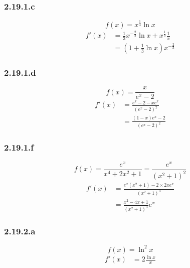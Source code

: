 \documentclass[a4paper,10pt]{report}
\begin{document}
\subsubsection*{2.19.1.c}
\begin{displaymath}
	f(x) = x^{\frac{1}{3}} \ln x
\end{displaymath}
\begin{equation*}
	\begin{split}
		f'(x) &= \frac{1}{3} x^{-\frac{2}{3}} \ln x + x^{\frac{1}{3}} \frac{1}{x} \\
		      &=\left(1 + \frac{1}{3}\ln x \right) x^{-\frac{2}{3}}
	\end{split}	
\end{equation*}

\subsubsection*{2.19.1.d}
\begin{displaymath}
	f(x) = \frac{x}{e^x-2}
\end{displaymath}
\begin{equation*}
	\begin{split}
		f'(x) &= \frac{e^x-2 - xe^x}{(e^x-2)^2} \\
		      &= \frac{(1-x)e^x-2}{(e^x-2)^2} 
	\end{split}	
\end{equation*}

\subsubsection*{2.19.1.f}
\begin{displaymath}
	f(x) = \frac{e^x}{x^4 + 2x^2 +1} =\frac{e^x}{(x^2 +1)^2}
\end{displaymath}
\begin{equation*}
	\begin{split}
		f'(x) &= \frac{e^x(x^2+1)-2 \times 2xe^x}{(x^2 +1)^3} \\
		      &= \frac{x^2 - 4x + 1}{(x^2 +1)^3}e^x
	\end{split}	
\end{equation*}



\subsubsection*{2.19.2.a}
\begin{displaymath}
	f(x) = \ln^2 x
\end{displaymath}
\begin{equation*}
	\begin{split}
		f'(x) &= 2\frac{\ln x}{x}
	\end{split}	
\end{equation*}
\end{document}
